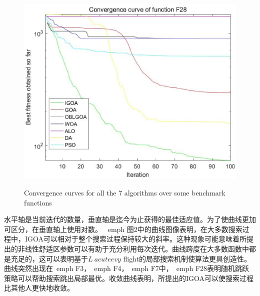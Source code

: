 \begin{figure}[htbp]
    \includegraphics[width=.33\linewidth]{function_F28.eps}\hfill\hfill\\[0.5cm]
  \caption{Convergence curves for all the 7 algorithms over some benchmark functions }
  \end{figure}


水平轴是当前迭代的数量，垂直轴是迄今为止获得的最佳适应值。为了使曲线更加可区分，在垂直轴上使用对数。 \ emph {图2}中的曲线图像表明，在大多数搜索过程中，IGOA可以相对于整个搜索过程保持较大的斜率。这种现象可能意味着所提出的非线性舒适区参数可以有助于充分利用每次迭代。曲线跨度在大多数函数中都是充足的，这可以表明基于$ L \ acute {e} vy $ flight的局部搜索机制使算法更具创造性。曲线突然出现在\ emph {F3}，\ emph {F4}，\ emph {F7}中，\ emph {F28}表明随机跳跃策略可以帮助搜索跳出局部最优。收敛曲线表明，所提出的IGOA可以使搜索过程比其他人更快地收敛。

